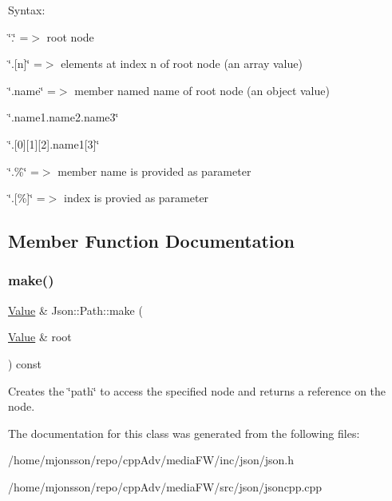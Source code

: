 Syntax\+:
\begin{DoxyItemize}
\item \char`\"{}.\char`\"{} =$>$ root node
\item \char`\"{}.\mbox{[}n\mbox{]}\char`\"{} =$>$ elements at index \textquotesingle{}n\textquotesingle{} of root node (an array value)
\item \char`\"{}.\+name\char`\"{} =$>$ member named \textquotesingle{}name\textquotesingle{} of root node (an object value)
\item \char`\"{}.\+name1.\+name2.\+name3\char`\"{}
\item \char`\"{}.\mbox{[}0\mbox{]}\mbox{[}1\mbox{]}\mbox{[}2\mbox{]}.\+name1\mbox{[}3\mbox{]}\char`\"{}
\item \char`\"{}.\%\char`\"{} =$>$ member name is provided as parameter
\item \char`\"{}.\mbox{[}\%\mbox{]}\char`\"{} =$>$ index is provied as parameter 
\end{DoxyItemize}

\subsection{Member Function Documentation}
\mbox{\label{classJson_1_1Path_a858f9426f0f7bbe0450644d72b44e26b}} 
\subsubsection{\texorpdfstring{make()}{make()}}
{\footnotesize\ttfamily \hyperlink{classJson_1_1Value}{Value} \& Json\+::\+Path\+::make (\begin{DoxyParamCaption}\item[{\hyperlink{classJson_1_1Value}{Value} \&}]{root }\end{DoxyParamCaption}) const}

Creates the \char`\"{}path\char`\"{} to access the specified node and returns a reference on the node. 

The documentation for this class was generated from the following files\+:\begin{DoxyCompactItemize}
\item 
/home/mjonsson/repo/cpp\+Adv/media\+F\+W/inc/json/json.\+h\item 
/home/mjonsson/repo/cpp\+Adv/media\+F\+W/src/json/jsoncpp.\+cpp\end{DoxyCompactItemize}
